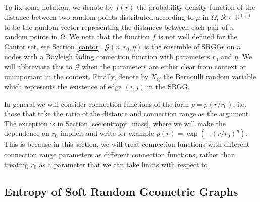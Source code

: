 \documentclass{article}
\newcommand{\graph}{\mathcal{G}}
\begin{document}
To fix some notation, we denote by $f(r)$ the probability density function of the distance between two random points distributed according to $\mu$ in $\Omega$, $\mathcal{R} \in \mathbb{R}^{\binom{n}{2}}$ to be the random vector representing the distances between each pair of $n$ random points in $\Omega$. We note that the function $f$ is not well defined for the Cantor set, see Section \ref{cantor}. $\graph(n,r_0,\eta)$ is the ensemble of SRGGs on $n$ nodes with a Rayleigh fading connection function with parameters $r_0$ and $\eta$. We will abbreviate this to $\graph$ when the parameters are either clear from context or unimportant in the context. Finally, denote by $X_{ij}$ the Bernoulli random variable which represents the existence of edge $(i,j)$ in the SRGG.

In general we will consider connection functions of the form $p= p(r/r_0)$, i.e. those that take the ratio of the distance and connection range as the argument. The exception is in Section \ref{sec:entropy_mass}, where we will make the dependence on $r_0$ implicit and write for example $p(r) = \exp(-(r/r_0)^\eta)$. This is because in this section, we will treat connection functions with different connection range parameters as different connection functions, rather than treating $r_0$ as a parameter that we can take limits with respect to.

\subsection{Entropy of Soft Random Geometric Graphs}
\end{document}
